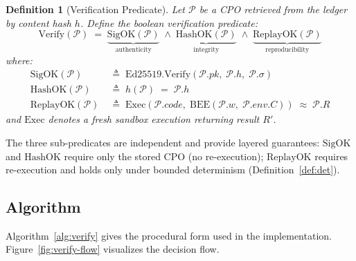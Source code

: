 \documentclass[11pt]{article}
\newtheorem{definition}{Definition}
\begin{document}
\begin{definition}[Verification Predicate]
\label{def:verify}
Let $\mathcal{P}$ be a CPO retrieved from the ledger by content hash $h$.
Define the boolean verification predicate:
\begin{equation}
  \mathrm{Verify}(\mathcal{P}) \;=\;
    \underbrace{\mathrm{SigOK}(\mathcal{P})}_{\text{authenticity}}
    \;\land\;
    \underbrace{\mathrm{HashOK}(\mathcal{P})}_{\text{integrity}}
    \;\land\;
    \underbrace{\mathrm{ReplayOK}(\mathcal{P})}_{\text{reproducibility}}
  \label{eq:verify}
\end{equation}
where:
\begin{align}
  \mathrm{SigOK}(\mathcal{P})   &\;\triangleq\;
    \mathrm{Ed25519.Verify}(\mathcal{P}.\mathit{pk},\;
                             \mathcal{P}.h,\;
                             \mathcal{P}.\sigma) \label{eq:sigok} \\[4pt]
  \mathrm{HashOK}(\mathcal{P})  &\;\triangleq\;
    h(\mathcal{P}) \;=\; \mathcal{P}.h \label{eq:hashok} \\[4pt]
  \mathrm{ReplayOK}(\mathcal{P}) &\;\triangleq\;
    \mathrm{Exec}(\mathcal{P}.\textit{code},\;
                   \mathrm{BEE}(\mathcal{P}.w,\; \mathcal{P}.\textit{env}.C))
    \;\approx\;
    \mathcal{P}.R \label{eq:replayok}
\end{align}
and $\mathrm{Exec}$ denotes a fresh sandbox execution returning result
$R'$.
\end{definition}

The three sub-predicates are independent and provide layered guarantees:
$\mathrm{SigOK}$ and $\mathrm{HashOK}$ require only the stored CPO (no
re-execution); $\mathrm{ReplayOK}$ requires re-execution and holds only
under bounded determinism (Definition~\ref{def:det}).

\subsection{Algorithm}

Algorithm~\ref{alg:verify} gives the procedural form used in the
implementation.  Figure~\ref{fig:verify-flow} visualizes the decision flow.
\end{document}
